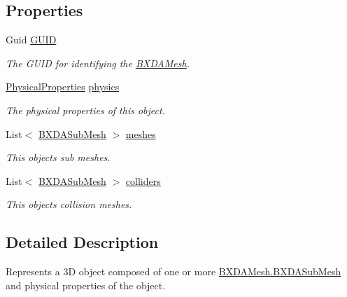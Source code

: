 \subsection*{Properties}
\begin{DoxyCompactItemize}
\item 
Guid \hyperlink{class_b_x_d_a_mesh_a7544e5c82afe8c5522424505766be4c0}{G\+U\+ID}
\begin{DoxyCompactList}\small\item\em The G\+U\+ID for identifying the \hyperlink{class_b_x_d_a_mesh}{B\+X\+D\+A\+Mesh}. \end{DoxyCompactList}\item 
\hyperlink{class_physical_properties}{Physical\+Properties} \hyperlink{class_b_x_d_a_mesh_a37230df9968f8aadca60bb342b08ba1b}{physics}
\begin{DoxyCompactList}\small\item\em The physical properties of this object. \end{DoxyCompactList}\item 
List$<$ \hyperlink{class_b_x_d_a_mesh_1_1_b_x_d_a_sub_mesh}{B\+X\+D\+A\+Sub\+Mesh} $>$ \hyperlink{class_b_x_d_a_mesh_a2782cf37716d225b7dce7dc69bfe03e5}{meshes}
\begin{DoxyCompactList}\small\item\em This object\textquotesingle{}s sub meshes. \end{DoxyCompactList}\item 
List$<$ \hyperlink{class_b_x_d_a_mesh_1_1_b_x_d_a_sub_mesh}{B\+X\+D\+A\+Sub\+Mesh} $>$ \hyperlink{class_b_x_d_a_mesh_ab18fc3dc7b16c729b8ad690d8f89d20c}{colliders}
\begin{DoxyCompactList}\small\item\em This object\textquotesingle{}s collision meshes. \end{DoxyCompactList}\end{DoxyCompactItemize}


\subsection{Detailed Description}
Represents a 3D object composed of one or more \hyperlink{class_b_x_d_a_mesh_1_1_b_x_d_a_sub_mesh}{B\+X\+D\+A\+Mesh.\+B\+X\+D\+A\+Sub\+Mesh} and physical properties of the object. 



